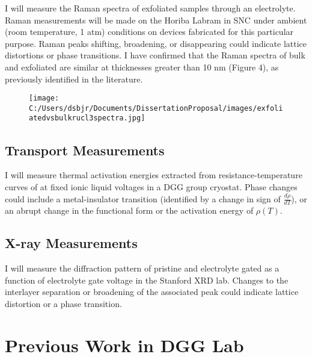 \documentclass[11pt]{article}
\begin{document}
I will measure the Raman spectra of exfoliated \rucl samples through an electrolyte. Raman measurements will be made on the Horiba Labram in SNC under ambient (room temperature, 1 atm) conditions on devices fabricated for this particular purpose. Raman peaks shifting, broadening, or disappearing could indicate lattice distortions or phase transitions. I have confirmed that the Raman spectra of bulk and exfoliated \rucl are similar at thicknesses greater than 10 nm (Figure 4), as previously identified in the literature.

\begin{figure}
\centering
	{\texttt{[image: C:/Users/dsbjr/Documents/DissertationProposal/images/exfoliatedvsbulkrucl3spectra.jpg]}\label{fig:f1}}
  \captionsetup{width=0.5\textwidth}
\end{figure}

\subsection{Transport Measurements}

I will measure thermal activation energies extracted from resistance-temperature curves of \rucl at fixed ionic liquid voltages in a DGG group cryostat. Phase changes could include a metal-insulator transition (identified by a change in sign of $\frac{d\rho}{dT}$), or an abrupt change in the functional form or the activation energy of $\rho(T)$.

\subsection{X-ray Measurements}

I will measure the diffraction pattern of pristine and electrolyte gated \rucl as a function of electrolyte gate voltage in the Stanford XRD lab. Changes to the interlayer separation or broadening of the associated peak could indicate lattice distortion or a phase transition.

\section{Previous Work in DGG Lab}
\end{document}
